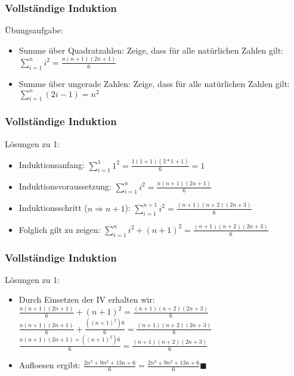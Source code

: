 \begin{frame}
    \frametitle{Vollständige Induktion}
    Übungsaufgabe:
        \begin{itemize}

    \vfill \item Summe über Quadratzahlen: Zeige, dass für alle natürlichen Zahlen gilt:
    \newline $\sum_{i=1}^{n} i^2 = \frac{n(n+1)(2n+1)}{6}$
     \vfill \item Summe über ungerade Zahlen: Zeige, dass für alle natürlichen Zahlen gilt:
    \newline $\sum_{i=1}^{n} (2i-1) = n^2$
    \end{itemize}

\end{frame}

\begin{frame}
    \frametitle{Vollständige Induktion}
    Lösungen zu 1:
        \begin{itemize}

    \vfill \item Induktionsanfang:
    \newline $\sum_{i=1}^{1} 1^2 = \frac{1(1+1)(2*1+1)}{6}=1$
    \newline \item Induktionsvoraussetzung:
    \newline $\sum_{i=1}^{n} i^2 = \frac{n(n+1)(2n+1)}{6}$
        \vfill \item Induktionsschritt ($n \Rightarrow n+1$):
    \newline $\sum_{i=1}^{n+1} i^2 = \frac{(n+1)(n+2)(2n+3)}{6}$
            \vfill \item Folglich gilt zu zeigen:
	\newline$\sum_{i=1}^{n} i^2 + (n+1)^2 = \frac{(n+1)(n+2)(2n+3)}{6}$
    \end{itemize}

\end{frame}

\begin{frame}
    \frametitle{Vollständige Induktion}
    Lösungen zu 1:
        \begin{itemize}
            \vfill $\sum_{i=1}^{n} i^2 + (n+1)^2 = \frac{(n+1)(n+2)(2n+3)}{6}$
            \vfill \item Durch Einsetzen der IV erhalten wir:
            \vfill $\frac{n(n+1)(2n+1)}{6} + (n+1)^2 = \frac{(n+1)(n+2)(2n+3)}{6} $
            \vfill $\frac{n(n+1)(2n+1)}{6} + \frac{((n+1)^2)6}{6} = \frac{(n+1)(n+2)(2n+3)}{6}$
            \vfill $\frac{n(n+1)(2n+1) + ((n+1)^2)6}{6} = \frac{(n+1)(n+2)(2n+3)}{6}$
            \vfill \item Aufloesen ergibt:
            \vfill $\frac{2n^3 + 9n^2 + 13n + 6}{6} = \frac{2n^3 + 9n^2 + 13n + 6}{6} \blacksquare$
        \end{itemize}

\end{frame}


